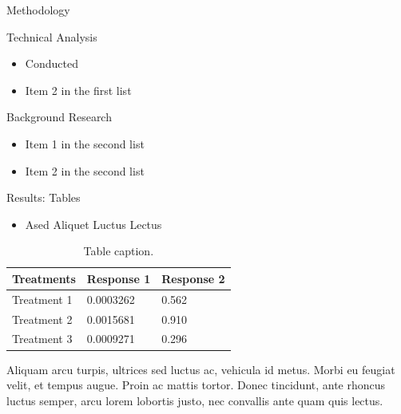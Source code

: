 \documentclass{beamer} %
\begin{document}
\begin{frame}[t]
\begin{columns}[t]
\begin{column}{0.3\textwidth}
\begin{block}{Methodology}
				\begin{minipage}{0.48\linewidth}
					Technical Analysis
					\begin{itemize}
						\item Conducted
						\item Item 2 in the first list
					\end{itemize}
				\end{minipage}
				\hfill %
				\begin{minipage}{0.48\linewidth}
					Background Research
					\begin{itemize}
						\item Item 1 in the second list
						\item Item 2 in the second list
					\end{itemize}
				\end{minipage}
			\end{block}


			\begin{block}{Results: Tables}
				\begin{itemize}
					\item Ased Aliquet Luctus Lectus
				\end{itemize}

				\begin{table}
					\caption{Table caption.}
					\begin{tabular}{l l l}
						\toprule
						\textbf{Treatments} & \textbf{Response 1} & \textbf{Response 2} \\
						\midrule
						Treatment 1         & 0.0003262           & 0.562               \\
						Treatment 2         & 0.0015681           & 0.910               \\
						Treatment 3         & 0.0009271           & 0.296               \\
						\bottomrule
					\end{tabular}
				\end{table}

				\bigskip\bigskip %

				Aliquam arcu turpis, ultrices sed luctus ac, vehicula id metus. Morbi eu feugiat velit, et tempus augue. Proin ac mattis tortor. Donec tincidunt, ante rhoncus luctus semper, arcu lorem lobortis justo, nec convallis ante quam quis lectus.


\end{block}
\end{column}
\end{columns}
\end{frame}
\end{document}
